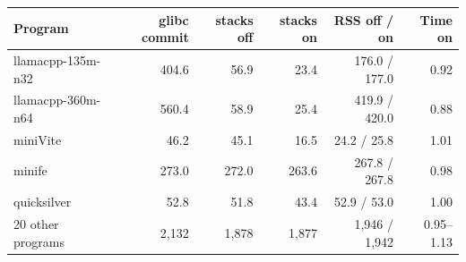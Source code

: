 \begin{tabular}{lrrrrr}
\toprule
Program & glibc commit & stacks off & stacks on & RSS off / on & Time on \\
\midrule
llamacpp-135m-n32 & 404.6 & 56.9 & 23.4 & 176.0 / 177.0 & 0.92 \\
llamacpp-360m-n64 & 560.4 & 58.9 & 25.4 & 419.9 / 420.0 & 0.88 \\
miniVite & 46.2 & 45.1 & 16.5 & 24.2 / 25.8 & 1.01 \\
minife & 273.0 & 272.0 & 263.6 & 267.8 / 267.8 & 0.98 \\
quicksilver & 52.8 & 51.8 & 43.4 & 52.9 / 53.0 & 1.00 \\
\midrule
20 other programs & 2{,}132 & 1{,}878 & 1{,}877 & 1{,}946 / 1{,}942 & 0.95--1.13 \\
\bottomrule
\end{tabular}

